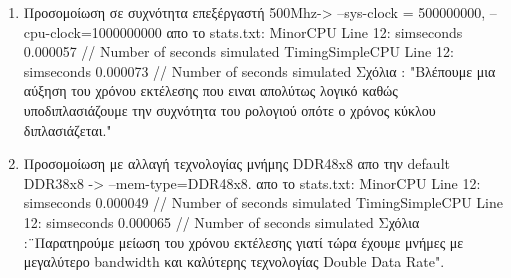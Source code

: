 \documentclass[10pt]{report}
\newcommand{\tu}{\textunderscore}
\begin{document}
\begin{enumerate}
\item Προσομοίωση σε συχνότητα επεξέργαστή 500Mhz-> --sys-clock = 500000000, --cpu-clock=1000000000 \newline
απο το stats.txt:\newline
MinorCPU\newline
Line 12:	sim\tu seconds	0.000057	// Number of seconds simulated\newline
TimingSimpleCPU\newline
Line 12:	sim\tu seconds  0.000073	// Number of seconds simulated\newline
Σχόλια : "Βλέπουμε μια αύξηση του χρόνου εκτέλεσης που ειναι απολύτως λογικό καθώς υποδιπλασιάζουμε την συχνότητα του ρολογιού οπότε ο χρόνος κύκλου διπλασιάζεται."
\item Προσομοίωση με αλλαγή τεχνολογίας μνήμης DDR4\tu 2400\tu 8x8 απο την default DDR3\tu 1600\tu 8x8 -> --mem-type=DDR4\tu 2400\tu 8x8.\newline
απο το stats.txt:\newline
MinorCPU\newline
Line 12:	sim\tu seconds	0.000049	// Number of seconds simulated\newline
TimingSimpleCPU\newline
Line 12:	sim\tu seconds  0.000065	// Number of seconds simulated\newline
Σχόλια :¨Παρατηρούμε μείωση του χρόνου εκτέλεσης γιατί τώρα έχουμε μνήμες με μεγαλύτερο bandwidth και καλύτερης τεχνολογίας Double Data Rate".
\end{enumerate}
\end{document}
